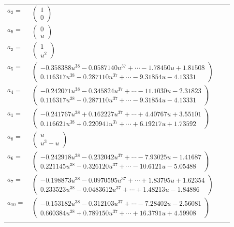 \documentclass[1p]{elsarticle_modified}
\theoremstyle{definition}
\begin{document}
\begin{tabular}{m{7pt} m{180pt} m{7pt} m{180pt} }
\flushright $a_{2}=$&$\begin{pmatrix}1\\0\end{pmatrix}$ \\
\flushright $a_{9}=$&$\begin{pmatrix}0\\u\end{pmatrix}$ \\
\flushright $a_{3}=$&$\begin{pmatrix}1\\u^2\end{pmatrix}$ \\
\flushright $a_{5}=$&$\begin{pmatrix}-0.358388 u^{38}-0.0587140 u^{37}+\cdots-1.78450 u+1.81508\\0.116317 u^{38}-0.287110 u^{37}+\cdots-9.31854 u-4.13331\end{pmatrix}$ \\
\flushright $a_{4}=$&$\begin{pmatrix}-0.242071 u^{38}-0.345824 u^{37}+\cdots-11.1030 u-2.31823\\0.116317 u^{38}-0.287110 u^{37}+\cdots-9.31854 u-4.13331\end{pmatrix}$ \\
\flushright $a_{1}=$&$\begin{pmatrix}-0.241767 u^{38}+0.162227 u^{37}+\cdots+4.40767 u+3.55101\\0.116621 u^{38}+0.220941 u^{37}+\cdots+6.19217 u+1.73592\end{pmatrix}$ \\
\flushright $a_{8}=$&$\begin{pmatrix}u\\u^3+u\end{pmatrix}$ \\
\flushright $a_{6}=$&$\begin{pmatrix}-0.242918 u^{38}-0.232042 u^{37}+\cdots-7.93025 u-1.41687\\0.221145 u^{38}-0.326120 u^{37}+\cdots-10.6121 u-5.05488\end{pmatrix}$ \\
\flushright $a_{7}=$&$\begin{pmatrix}-0.198873 u^{38}-0.0970595 u^{37}+\cdots+1.83795 u+1.62354\\0.233523 u^{38}-0.0483612 u^{37}+\cdots+1.48213 u-1.84886\end{pmatrix}$ \\
\flushright $a_{10}=$&$\begin{pmatrix}-0.153182 u^{38}-0.312103 u^{37}+\cdots-7.28402 u-2.56081\\0.660384 u^{38}+0.789150 u^{37}+\cdots+16.3791 u+4.59908\end{pmatrix}$\\&\end{tabular}
\end{document}
